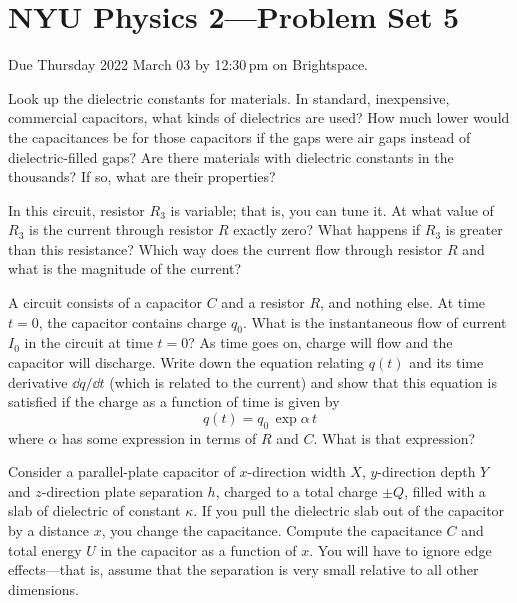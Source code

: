 \documentclass[12pt]{article}
\begin{document}
\section*{NYU Physics 2---Problem Set 5}

Due Thursday 2022 March 03 by 12:30\,pm on Brightspace.

\startproblem%
Look up the dielectric constants for materials.
In standard, inexpensive, commercial capacitors, what kinds of dielectrics are used?
How much lower would the capacitances be for those capacitors if the gaps were air gaps instead
of dielectric-filled gaps?
Are there materials with dielectric constants in the thousands? If so, what are their properties?

\startproblem%
In this circuit, resistor $R_3$ is variable; that is, you can tune it. At what value of $R_3$
is the current through resistor $R$ exactly zero? What happens if $R_3$ is
greater than this resistance? Which way does the current flow through resistor $R$ and what is
the magnitude of the current?

\startproblem%
A circuit consists of a capacitor $C$ and a resistor $R$,
and nothing else.
At time $t=0$, the capacitor contains charge $q_0$.
What is the instantaneous flow of current $I_0$ in the circuit at time $t=0$?
As time goes on, charge will flow and the capacitor will discharge.
Write down the equation relating $q(t)$ and its time derivative $\dd q/\dd t$ (which
is related to the current) and show that this equation is satisfied if the charge
as a function of time is given by
\begin{equation}
q(t) = q_0\,\exp \alpha\,t
\end{equation}
where $\alpha$ has some expression in terms of $R$ and $C$. What is that expression?

\startproblem%
Consider a parallel-plate capacitor of $x$-direction width $X$,
$y$-direction depth $Y$ and $z$-direction plate
separation $h$, charged to a total charge $\pm Q$, filled with a slab of
dielectric of constant $\kappa$.  If you pull
the dielectric slab out of the capacitor by a distance $x$, you change
the capacitance. Compute the capacitance $C$ and
total energy $U$ in the capacitor as a function of $x$. You will have to
ignore edge effects---that is, assume that the separation is very small
relative to all other dimensions.
\end{document}
